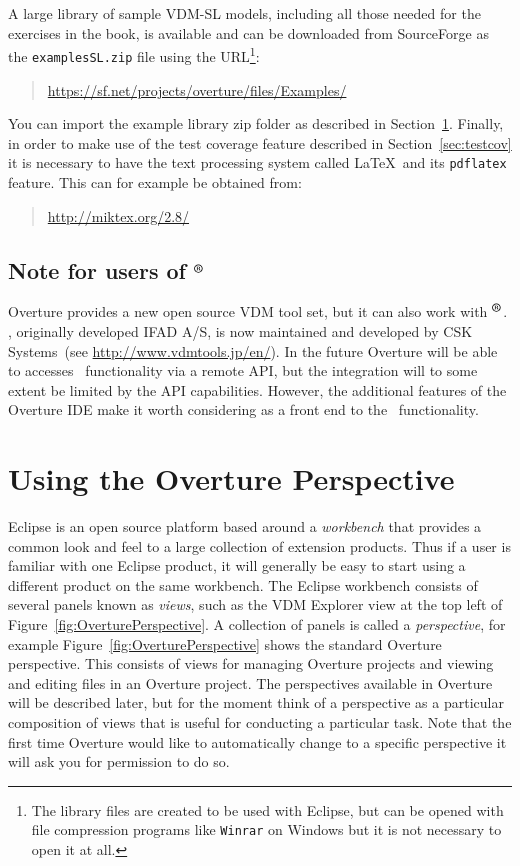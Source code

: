 A large library of sample VDM-SL models, including all those needed
for the exercises in the book, is available and can be downloaded from
SourceForge as the \texttt{examplesSL.zip} file using the
URL\footnote{The library files are created to be used with Eclipse,
  but can be opened with file compression programs like \texttt{Winrar} on
  Windows but it is not necessary to open it at all.}: 
\begin{quote}
\url{https://sf.net/projects/overture/files/Examples/}
\end{quote}
You can import the example library zip folder as described in
Section~\ref{sec:vdmsupport}.  Finally, in order to make use of the
test coverage feature described in Section~\ref{sec:testcov} it is
necessary to have the text processing system called \LaTeX\ and its
\texttt{pdflatex} feature. This can for example be obtained from:
\begin{quote}
\url{http://miktex.org/2.8/}
\end{quote}

\subsection*{Note for users of \vdmtools$^{\mbox{\small\textbf{{\textregistered}}}}$}
Overture provides a new open source VDM tool set, but it can
also work with
\vdmtools$^{\mbox{\small\textbf{{\textregistered}}}}$. \vdmtools, originally developed IFAD A/S, is now
maintained and developed by CSK Systems~(see
\url{http://www.vdmtools.jp/en/}). In the future Overture will be able
to accesses
\vdmtools\ functionality via a remote API, but the integration will to
some extent be limited by the API capabilities. However, the additional
features of the Overture IDE make it worth considering as a front end
to the \vdmtools\ functionality.

\section{Using the Overture Perspective}\label{sec:vdmsupport}

Eclipse is an open source platform based around a \emph{workbench}
that provides a common look and feel to a large collection of
extension products. Thus if a user is familiar with one Eclipse
product, it will generally be easy to start using a different product
on the same workbench. The Eclipse workbench consists of several
panels known as \emph{views}, such as the VDM Explorer view at the
top left of Figure~\ref{fig:OverturePerspective}. A
collection of panels is called a \emph{perspective}, for example
Figure~\ref{fig:OverturePerspective} shows the standard
Overture perspective. This consists of views for managing Overture
projects and viewing and editing files in an Overture project. The perspectives
available in Overture will be described later, but for the moment
think of a perspective as a particular composition of views that is
useful for conducting a particular task. Note that the first time
Overture would like to automatically change to a specific perspective
it will ask you for permission to do so.

